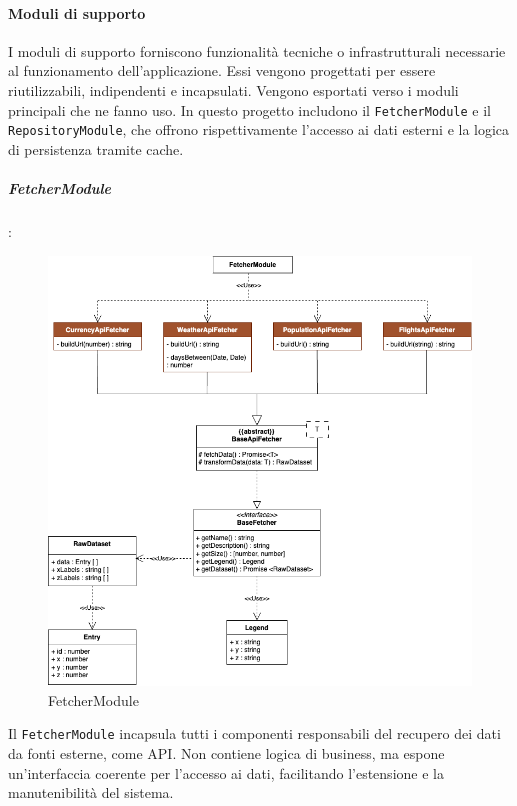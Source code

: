\paragraph{Moduli di supporto}
I moduli di supporto forniscono funzionalità tecniche o infrastrutturali necessarie al funzionamento dell’applicazione.
Essi vengono progettati per essere riutilizzabili, indipendenti e incapsulati. Vengono esportati verso i moduli principali che ne fanno uso.
In questo progetto includono il \texttt{FetcherModule} e il \texttt{RepositoryModule}, che offrono rispettivamente l'accesso ai dati esterni e la logica di persistenza tramite cache.


\subparagraph{FetcherModule}:

\begin{figure}[H] 
    \centering
    \includegraphics[scale = 0.5]{template/images/uml_back/FetcherModule.png}
    \caption{FetcherModule}
\end{figure}

Il \texttt{FetcherModule} incapsula tutti i componenti responsabili del recupero dei dati da fonti esterne, come API. Non contiene logica di business, ma espone un'interfaccia coerente per l’accesso ai dati, facilitando l’estensione e la manutenibilità del sistema.\\

